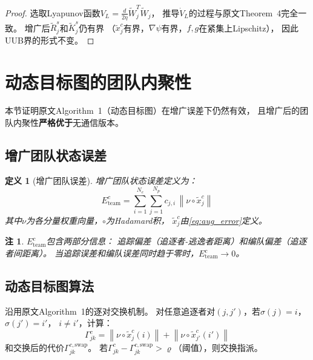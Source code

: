\documentclass[11pt,a4paper]{article}
\newtheorem{definition}{定义}
\newtheorem{remark}{注}
\newcommand{\norm}[1]{\left\|#1\right\|}
\begin{document}
\begin{proof}
  选取Lyapunov函数$V_L = \frac{d}{2\eta}\tilde{W}_j^T \tilde{W}_j$，
  推导$\dot{V}_L$的过程与原文Theorem~4完全一致。
  增广后$\tilde{R}_j^s$和$\tilde{K}_j^s$仍有界
  （$\tilde{x}_j^c$有界，$\nabla\psi$有界，$f,g$在紧集上Lipschitz），
  因此UUB界的形式不变。
\end{proof}


\section{动态目标图的团队内聚性}

本节证明原文Algorithm~1（动态目标图）在增广误差下仍然有效，
且增广后的团队内聚性\textbf{严格优于}无通信版本。

\subsection{增广团队状态误差}

\begin{definition}[增广团队误差]\label{def:team_error}
  增广团队状态误差定义为：
  \begin{equation}\label{eq:E_team}
    E_{\mathrm{team}}^c =
    \sum_{i=1}^{N_e} \sum_{j=1}^{N_p} c_{j,i}\,
    \norm{\nu \circ \tilde{x}_j^c}
  \end{equation}
  其中$\nu$为各分量权重向量，$\circ$为Hadamard积，
  $\tilde{x}_j^c$由\eqref{eq:aug_error}定义。
\end{definition}

\begin{remark}
  $E_{\mathrm{team}}^c$包含两部分信息：
  追踪偏差（追逐者-逃逸者距离）和编队偏差（追逐者间距离）。
  当追踪误差和编队误差同时趋于零时，$E_{\mathrm{team}}^c \to 0$。
\end{remark}

\subsection{动态目标图算法}

沿用原文Algorithm~1的逐对交换机制。
对任意追逐者对$(j, j')$，若$\sigma(j) = i$，$\sigma(j') = i'$，
$i \neq i'$，计算：
\begin{equation}\label{eq:swap_cost}
  \Gamma_{jk}^c = \norm{\nu \circ \tilde{x}_j^c(i)}
  + \norm{\nu \circ \tilde{x}_{j'}^c(i')}
\end{equation}
和交换后的代价$\Gamma_{jk}^{c,\text{swap}}$。
若$\Gamma_{jk}^c - \Gamma_{jk}^{c,\text{swap}} > \varrho$（阈值），则交换指派。
\end{document}
